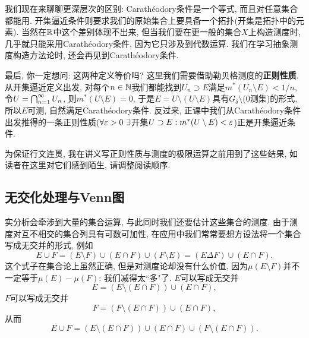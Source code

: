 我们现在来聊聊更深层次的区别: 
Carath\'eodory条件是一个等式, 而且对任意集合都能用. 开集逼近条件则要求我们的原始集合上要具备一个拓扑(开集是拓扑中的元素). 当然在$\mathbb{R}$中这个差别体现不出来, 但当我们要在更一般的集合$X$上构造测度时, 几乎就只能采用Carath\'eodory条件, 因为它只涉及到代数运算. 我们在学习抽象测度构造方法论时, 还会再见到Carath\'eodory条件. 

最后, 你一定想问: 这两种定义等价吗? 这里我们需要借助勒贝格测度的\textbf{正则性质}. 从开集逼近定义出发, 对每个$n \in \mathbb{N}$我们都能找到$U_n \supset E$满足$m^*(U_n \setminus E) < 1/n$, 令$U = \bigcap_{n=1}^{\infty}U_n$, 则$m^*(U \setminus E) = 0$, 于是$E = U \setminus (U \setminus E)$具有$G_\delta \setminus$(0测集)的形式, 所以$E$可测, 自然满足Carath\'eodory条件. 反过来, 正课中我们从Carath\'eodory条件出发推得的一条正则性质($\forall \varepsilon>0~\exists$开集$U \supset E: m^*(U \setminus E)<\varepsilon$)正是开集逼近条件.

\begin{remark}
    为保证行文连贯, 我在讲义写正则性质与测度的极限运算之前用到了这些结果, 如读者在这里对它们感到陌生, 请调整阅读顺序. 
\end{remark}




\subsection{无交化处理与Venn图}
实分析会牵涉到大量的集合运算, 与此同时我们还要估计这些集合的测度. 
由于测度对互不相交的集合列具有可数可加性, 在应用中我们常常要想方设法将一个集合写成无交并的形式, 例如
$$E \cup F = (E \setminus F) \cup (E \cap F) \cup (F \setminus E) = (E \Delta F) \cup (E \cap F).$$
这个式子在集合论上虽然正确, 但是对测度论却没有什么价值, 因为$\mu(E \setminus F)$并不一定等于$\mu(E) - \mu(F)$: 我们减得太``多"了.
$E$可以写成无交并$$E=(E \setminus (E \cap F)) \cup (E \cap F),$$ 
$F$可以写成无交并$$F=(F \setminus (E \cap F)) \cup (E \cap F),$$
从而
$$E \cup F = (E \setminus (E \cap F)) \cup (E \cap F) \cup (F \setminus (E \cap F)). $$

